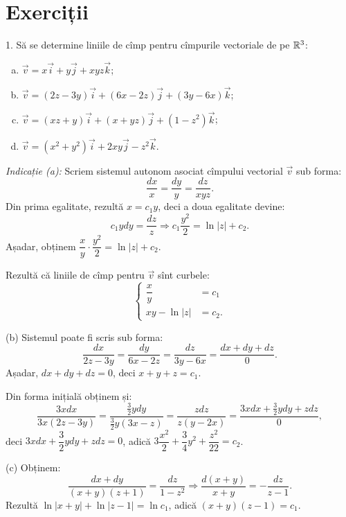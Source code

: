 
\section{Exerciții}

1. Să se determine liniile de cîmp pentru cîmpurile vectoriale de pe $\mathbb{R}^3$:
\begin{enumerate}[(a)]
\item $\vec{v} = x\vec{i} + y \vec{j} + xyz \vec{k}$;
\item $\vec{v} = (2z - 3y)\vec{i} + (6x - 2z)\vec{j} + (3y - 6x)\vec{k}$;
\item $\vec{v} = (xz + y) \vec{i} + (x + yz) \vec{j} + (1 - z^2)\vec{k}$;
\item $\vec{v} = (x^2 + y^2)\vec{i} + 2xy \vec{j} - z^2 \vec{k}$.
\end{enumerate}

\emph{Indicație (a):} Scriem sistemul autonom asociat cîmpului vectorial $\vec{v}$
sub forma:
\[
  \frac{dx}{x} = \frac{dy}{y} = \frac{dz}{xyz}.
\]
Din prima egalitate, rezultă $x = c_1 y$, deci a doua egalitate devine:
\[
  c_1 ydy = \frac{dz}{z} \Rightarrow c_1 \frac{y^2}{2} = \ln |z| + c_2.
\]
Așadar, obținem $\dfrac{x}{y} \cdot \dfrac{y^2}{2} = \ln |z| + c_2$.

Rezultă că liniile de cîmp pentru $\vec{v}$ sînt curbele:
\[
  \begin{cases}
    \dfrac{x}{y} &= c_1 \\
    xy - \ln|z| &= c_2.
  \end{cases}
\]

\vspace{1cm}

(b) Sistemul poate fi scris sub forma:
\[
  \frac{dx}{2z - 3y} = \frac{dy}{6x - 2z} = \frac{dz}{3y-6x} = \frac{dx + dy + dz}{0}.
\]
Așadar, $dx + dy + dz = 0$, deci $x + y + z = c_1$.

Din forma inițială obținem și:
\[
  \frac{3xdx}{3x(2z - 3y)} = \frac{\frac{3}{2}ydy}{\frac{3}{2}y(3x - z)} = \frac{zdz}{z(y - 2x)} = %
  \frac{3xdx + \frac{3}{2}ydy + zdz}{0},
\]
deci $3xdx + \dfrac{3}{2}ydy + zdz = 0$, adică
$3\dfrac{x^2}{2} + \dfrac{3}{4}y^2 + \dfrac{z^2}{22} = c_2$.

\vspace{1cm}

(c) Obținem:
\[
  \frac{dx + dy}{(x + y)(z + 1)} = \frac{dz}{1 - z^2} \Rightarrow %
  \frac{d(x + y)}{x + y} = -\frac{dz}{z - 1}.
\]
Rezultă $\ln|x + y| + \ln|z - 1| = \ln c_1$, adică $(x + y)(z - 1) = c_1$.

